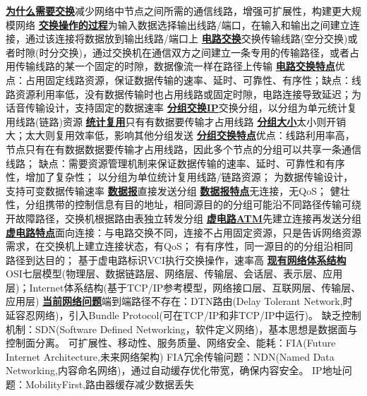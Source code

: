 \documentclass[twocolumn]{ctexart}
\renewcommand{\emph}[1]{\textbf{\underline{#1}}}
\begin{document}
\emph{为什么需要交换}减少网络中节点之间所需的通信线路，增强可扩展性，构建更大规模网络
\emph{交换操作的过程}为输入数据选择输出线路/端口，在输入和输出之间建立连接，通过该连接将数据放到输出线路/端口上
\emph{电路交换}交换传输线路(空分交换)或者时隙(时分交换)，通过交换机在通信双方之间建立一条专用的传输路径，或者占用传输线路的某一个固定的时隙，数据像流一样在路径上传输
\emph{电路交换特点}优点：占用固定线路资源，保证数据传输的速率、延时、可靠性、有序性；缺点：线路资源利用率低，没有数据传输时也占用线路或固定时隙，电路连接导致延迟；为话音传输设计，支持固定的数据速率
\emph{分组交换IP}交换分组，以分组为单元统计复用线路(链路)资源
\emph{统计复用}只有有数据要传输才占用线路
\emph{分组大小}太小则开销大；太大则复用效率低，影响其他分组发送
\emph{分组交换特点}优点：线路利用率高，节点只有在有数据数据要传输才占用线路，因此多个节点的分组可以共享一条通信线路；
缺点：需要资源管理机制来保证数据传输的速率、延时、可靠性和有序性，增加了复杂性；
以分组为单位统计复用线路/链路资源；
为数据传输设计，支持可变数据传输速率
\emph{数据报}直接发送分组
\emph{数据报特点}无连接，无QoS；
健壮性，分组携带的控制信息有目的地址，相同源目的的分组可能沿不同路径传输可绕开故障路径，交换机根据路由表独立转发分组
\emph{虚电路ATM}先建立连接再发送分组
\emph{虚电路特点}面向连接：与电路交换不同，连接不占用固定资源，只是告诉网络资源需求，在交换机上建立连接状态，有QoS；
有有序性，同一源目的的分组沿相同路径到达目的；
基于虚电路标识VCI执行交换操作，速率高
\emph{现有网络体系结构}OSI七层模型(物理层、数据链路层、网络层、传输层、会话层、表示层、应用层)；Internet体系结构(基于TCP/IP参考模型，网络接口层、互联网层、传输层、应用层)
\emph{当前网络问题}端到端路径不存在：DTN路由(Delay Tolerant Network,时延容忍网络)，引入Bundle Protocol(可在TCP/IP和非TCP/IP中运行)。
缺乏控制机制：SDN(Software Defined Networking，软件定义网络)，基本思想是数据面与控制面分离。
可扩展性、移动性、服务质量、网络安全、能耗：FIA(Future Internet Architecture,未来网络架构)
FIA冗余传输问题：NDN(Named Data Networking,内容命名网络)，通过自动缓存优化带宽，确保内容安全。
IP地址问题：MobilityFirst,路由器缓存减少数据丢失
\end{document}
